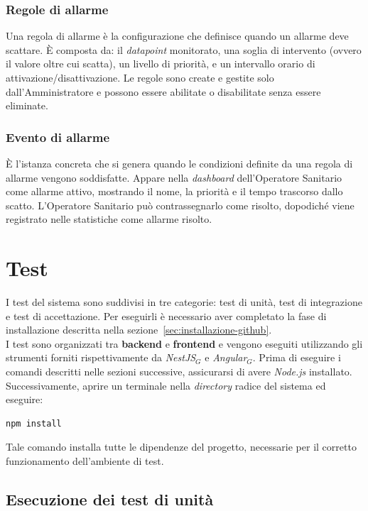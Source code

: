 \documentclass[10pt, letterpaper]{article}
\begin{document}
\subsubsection{Regole di allarme}
Una regola di allarme è la configurazione che definisce quando un 
allarme deve scattare. 
È composta da: il \textit{datapoint} monitorato, una soglia di intervento 
(ovvero il valore oltre cui scatta), un livello di priorità, 
e un intervallo orario di attivazione/disattivazione. 
Le regole sono create e gestite solo dall'Amministratore e possono essere 
abilitate o disabilitate senza essere eliminate.
\subsubsection{Evento di allarme}
È l'istanza concreta che si genera quando le condizioni definite da 
una regola di allarme vengono soddisfatte. 
Appare nella \textit{dashboard} dell'Operatore Sanitario come allarme attivo, 
mostrando il nome, la priorità e il tempo trascorso dallo scatto. 
L'Operatore Sanitario può contrassegnarlo come risolto, 
dopodiché viene registrato nelle statistiche come allarme risolto.

\section{Test}

I test del sistema sono suddivisi in tre categorie: test di unità, test di integrazione e test di accettazione.
Per eseguirli è necessario aver completato la fase di installazione descritta nella sezione~\ref{sec:installazione-github}.
\\I test sono organizzati tra \textbf{backend} e \textbf{frontend} e vengono eseguiti utilizzando gli strumenti forniti rispettivamente da \textit{NestJS}$_G$ e \textit{Angular}$_G$.
Prima di eseguire i comandi descritti nelle sezioni successive, assicurarsi di avere \textit{Node.js} installato. Successivamente, aprire un terminale nella \textit{directory} radice del sistema ed eseguire:
\begin{verbatim}
npm install
\end{verbatim}
Tale comando installa tutte le dipendenze del progetto, necessarie per il corretto funzionamento dell'ambiente di test.
\subsection{Esecuzione dei test di unità}
\end{document}
